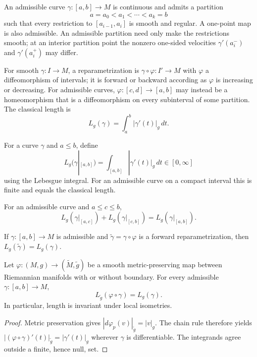 An admissible curve $\gamma:[a,b]\to M$ is continuous and admits a partition
\[
a=a_0<a_1<\cdots<a_k=b
\]
such that every restriction to $[a_{i-1},a_i]$ is smooth and regular. A one-point map is also admissible. An admissible partition need only make the restrictions smooth; at an interior partition point the nonzero one-sided velocities $\gamma'(a_i^-)$ and $\gamma'(a_i^+)$ may differ.

For smooth $\gamma:I\to M$, a reparametrization is $\gamma\circ\varphi:I'\to M$ with $\varphi$ a diffeomorphism of intervals; it is forward or backward according as $\varphi$ is increasing or decreasing. For admissible curves, $\varphi:[c,d]\to[a,b]$ may instead be a homeomorphism that is a diffeomorphism on every subinterval of some partition. The classical length is
\[
L_g(\gamma)=\int_a^b|\gamma'(t)|_g\,dt.
\]

\begin{definition}
\label{def:length-of-curve}
\mathlibok
{}
For a curve $\gamma$ and $a\le b$, define
\[
L_g(\gamma|_{[a,b]})=\int_{[a,b]}|\gamma'(t)|_g\,dt\in[0,\infty]
\]
using the Lebesgue integral. For an admissible curve on a compact interval this is finite and equals the classical length.
\end{definition}

\begin{proposition}
\label{prop:length-additive}
\mathlibok
{}
For an admissible curve and $a\le c\le b$,
\[
L_g(\gamma|_{[a,c]})+L_g(\gamma|_{[c,b]})=L_g(\gamma|_{[a,b]}).
\]
\end{proposition}

\begin{proposition}
\label{prop:length-reparam-invariant}
\mathlibok
{}
If $\gamma:[a,b]\to M$ is admissible and $\widetilde\gamma=\gamma\circ\varphi$ is a forward reparametrization, then $L_g(\widetilde\gamma)=L_g(\gamma)$.
\end{proposition}

\begin{proposition}
\label{prop:length-isometry-invariant}
\leanok
{}
Let $\varphi:(M,g)\to(\widetilde M,\widetilde g)$ be a smooth metric-preserving map between Riemannian manifolds with or without boundary. For every admissible $\gamma:[a,b]\to M$,
\[
L_{\widetilde g}(\varphi\circ\gamma)=L_g(\gamma).
\]
In particular, length is invariant under local isometries.
\end{proposition}
\begin{proof}
\leanok
{}
\sketch Metric preservation gives $|d\varphi_p(v)|_{\widetilde g}=|v|_g$. The chain rule therefore yields $|(\varphi\circ\gamma)'(t)|_{\widetilde g}=|\gamma'(t)|_g$ wherever $\gamma$ is differentiable. The integrands agree outside a finite, hence null, set.
\end{proof}

